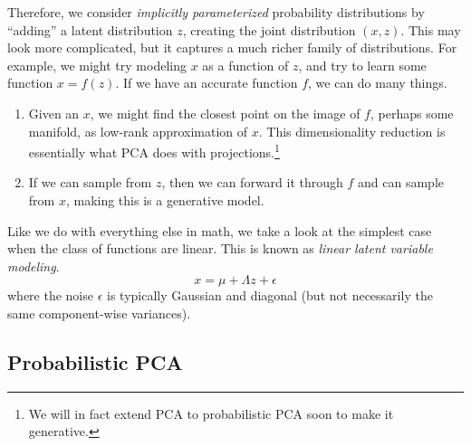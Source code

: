   Therefore, we consider \textit{implicitly parameterized} probability distributions by ``adding'' a latent distribution $z$, creating the joint distribution $(x, z)$. This may look more complicated, but it captures a much richer family of distributions. For example, we might try modeling $x$ as a function of $z$, and try to learn some function $x = f(z)$. If we have an accurate function $f$, we can do many things. 
  \begin{enumerate}
    \item Given an $x$, we might find the closest point on the image of $f$, perhaps some manifold, as low-rank approximation of $x$. This dimensionality reduction is essentially what PCA does with projections.\footnote{We will in fact extend PCA to probabilistic PCA soon to make it generative.} 
    \item If we can sample from $z$, then we can forward it through $f$ and can sample from $x$, making this is a generative model. 
  \end{enumerate}

  Like we do with everything else in math, we take a look at the simplest case when the class of functions are linear. This is known as \textit{linear latent variable modeling}. 
  \begin{equation}
    x = \mu + \Lambda z + \epsilon
  \end{equation}
  where the noise $\epsilon$ is typically Gaussian and diagonal (but not necessarily the same component-wise variances). 

\subsection{Probabilistic PCA}

